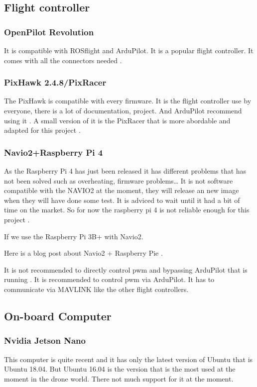 \subsection{Flight controller}
\subsubsection{OpenPilot Revolution}
It is compatible with ROSflight and ArduPilot. It is a popular flight controller.
It comes with all the connectors needed \cite{bangood_revo}.


\subsubsection{PixHawk 2.4.8/PixRacer}
The PixHawk is compatible with every firmware.
It is the flight controller use by everyone, there is a lot of documentation, project. And ArduPilot recommend using it \cite{ardupilot_choose_fc}.
A small version of it is the PixRacer that is more abordable and adapted for this project \cite{mrobotics_pixracer}.

\subsubsection{Navio2+Raspberry Pi 4}
As the Raspberry Pi 4 has just been released it has different problems that has not been solved such as overheating, firmware problems… It is not software compatible with the NAVIO2 at the moment, they will release an new image when they will have done some test. It is adviced to wait until it had a bit of time on the market. So for now the raspberry pi 4 is not reliable enough for this project \cite{ardupilot_rpi_compatibility}.

If we use the Raspberry Pi 3B+ with Navio2.

Here is a blog post about Navio2 + Raspberry Pie \cite{dojofordrones_rpi_drone}.

It is not recommended to directly control pwm and bypassing ArduPilot that is running \cite{emlid_servo_control}. It is recommended to control pwm via ArduPilot. It has to communicate via MAVLINK like the other flight controllers.

\subsection{On-board Computer}
\subsubsection{Nvidia Jetson Nano}
This computer is quite recent and it has only the latest version of Ubuntu that is Ubuntu 18.04.
But Ubuntu 16.04 is the version that is the most used at the moment in the drone world.
There not much support for it at the moment.

